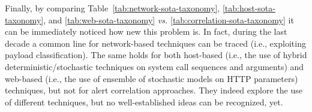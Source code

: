Finally, by comparing Table~\ref{tab:network-sota-taxonomy},
\ref{tab:host-sota-taxonomy}, and \ref{tab:web-sota-taxonomy}
\emph{vs.}  \ref{tab:correlation-sota-taxonomy} it can be immediately
noticed how new this problem is. In fact, during the last decade a
common line for network-based techniques can be traced (i.e.,
exploiting payload classification). The same holds for both host-based
(i.e., the use of hybrid deterministic/stochastic techniques on system
call sequences and arguments) and web-based (i.e., the use of ensemble
of stochastic models on \ac{HTTP} parameters) techniques,
but not for alert correlation approaches. They indeed explore the use
of different techniques, but no well-established ideas can be
recognized, yet.


